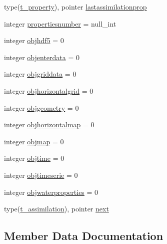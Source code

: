 \begin{DoxyCompactItemize}
\item 
type(\mbox{\hyperlink{structmoduleassimilation_1_1t__property}{t\+\_\+property}}), pointer \mbox{\hyperlink{structmoduleassimilation_1_1t__assimilation_afa0283c1a63a0c5921e5722d20824fd6}{lastassimilationprop}}
\item 
integer \mbox{\hyperlink{structmoduleassimilation_1_1t__assimilation_a24c8f3b22d1ea6ce3073fc13a8a8f383}{propertiesnumber}} = null\+\_\+int
\item 
integer \mbox{\hyperlink{structmoduleassimilation_1_1t__assimilation_a87dc1129a4f6f9f96b4e12028a26984c}{objhdf5}} = 0
\item 
integer \mbox{\hyperlink{structmoduleassimilation_1_1t__assimilation_add169ed71165f1a4b459349ab59360dd}{objenterdata}} = 0
\item 
integer \mbox{\hyperlink{structmoduleassimilation_1_1t__assimilation_a46807cb646220a9387fb4fcfaa7e64c8}{objgriddata}} = 0
\item 
integer \mbox{\hyperlink{structmoduleassimilation_1_1t__assimilation_a62694b73a5ffa3844dcbc5a719a14c4e}{objhorizontalgrid}} = 0
\item 
integer \mbox{\hyperlink{structmoduleassimilation_1_1t__assimilation_ac3cc5e6abab074cbc11bb51fcbc18436}{objgeometry}} = 0
\item 
integer \mbox{\hyperlink{structmoduleassimilation_1_1t__assimilation_af488d974b1386f81edbda66188420152}{objhorizontalmap}} = 0
\item 
integer \mbox{\hyperlink{structmoduleassimilation_1_1t__assimilation_aa4975981153d2db619142dc7b8f7f6e1}{objmap}} = 0
\item 
integer \mbox{\hyperlink{structmoduleassimilation_1_1t__assimilation_ad2e324621dd5944127b6338d5915e182}{objtime}} = 0
\item 
integer \mbox{\hyperlink{structmoduleassimilation_1_1t__assimilation_ae156da2ae4a479881566c31986661e67}{objtimeserie}} = 0
\item 
integer \mbox{\hyperlink{structmoduleassimilation_1_1t__assimilation_a1d7a04c61c27380378372e2d8a730171}{objwaterproperties}} = 0
\item 
type(\mbox{\hyperlink{structmoduleassimilation_1_1t__assimilation}{t\+\_\+assimilation}}), pointer \mbox{\hyperlink{structmoduleassimilation_1_1t__assimilation_ae60f80f625de3ed7c12c4c35016487d1}{next}}
\end{DoxyCompactItemize}


\subsection{Member Data Documentation}
\mbox{\label{structmoduleassimilation_1_1t__assimilation_a6586968649f2f6f5b4ebd8c1bbba95ec}} 
